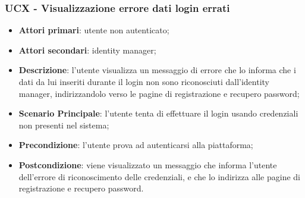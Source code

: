 \subsubsection{UCX - Visualizzazione errore dati login errati}
\begin{itemize}
\item \textbf{Attori primari}: utente non autenticato;
\item \textbf{Attori secondari}: identity manager;
\item \textbf{Descrizione}: l'utente visualizza un messaggio di errore che lo informa che i dati da lui inseriti durante il login non sono riconosciuti dall'identity manager, indirizzandolo verso le pagine di registrazione e recupero password;
\item \textbf{Scenario Principale}: l'utente tenta di effettuare il login usando credenziali non presenti nel sistema;
\item \textbf{Precondizione}: l'utente prova ad autenticarsi alla piattaforma;
\item \textbf{Postcondizione}: viene visualizzato un messaggio che informa l'utente dell'errore di riconoscimento delle credenziali, e che lo indirizza alle pagine di registrazione e recupero password.
\end{itemize}